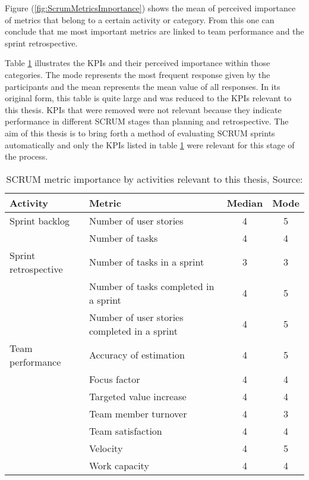 \noindent Figure (\ref{fig:ScrumMetricsImportance}) shows the mean of perceived importance 
of metrics that belong to a certain activity or category. 
From this one can conclude that me most important metrics are linked to 
team performance and the sprint retrospective.

\noindent Table \ref{tab:ScrumMetricsImportanceTable} illustrates the KPIs and their 
perceived importance within those categories. 
The mode represents the most frequent response given by the 
participants and the mean represents the mean value of all responses. In its original form,
this table is quite large and was reduced to the KPIs relevant to this thesis. KPIs that were removed
were not relevant because they indicate performance in different SCRUM stages than planning and retrospective.
The aim of this thesis is to bring forth a method of evaluating SCRUM sprints automatically and only the KPIs listed 
in table \ref{tab:ScrumMetricsImportanceTable} were relevant for this stage of the process.


\begin{table}[]
    \centering
    \begin{tabular}{l l c c}
        \hline
        \textbf{Activity} & \textbf{Metric} & \textbf{Median} & \textbf{Mode} \\
        \hline
        Sprint backlog & Number of user stories & 4 & 5 \\
        & Number of tasks & 4 & 4 \\
        Sprint retrospective & Number of tasks in a sprint & 3 & 3 \\
        & Number of tasks completed in a sprint & 4 & 5 \\
        & Number of user stories completed in a sprint & 4 & 5 \\
        Team performance & Accuracy of estimation & 4 & 5 \\
        & Focus factor & 4 & 4 \\
        & Targeted value increase & 4 & 4 \\
        & Team member turnover & 4 & 3 \\
        & Team satisfaction & 4 & 4 \\
        & Velocity & 4 & 5 \\
        & Work capacity & 4 & 4 \\
    \end{tabular}
    \decoRule
    \caption[SCRUM metrics]{SCRUM metric importance by activities relevant to this thesis, Source: \cite{PercPerfOfMetrForAgileScrumEnv}}
    \label{tab:ScrumMetricsImportanceTable}
\end{table}

